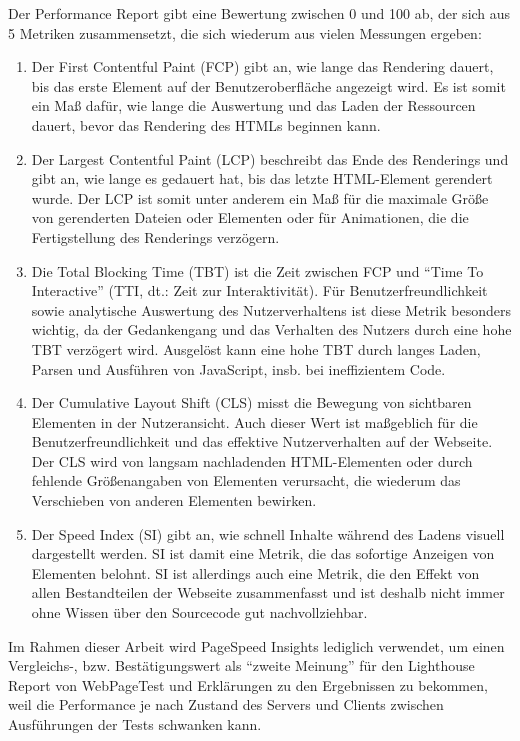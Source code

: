 \documentclass[11pt,a4paper]{article}
\begin{document}
Der Performance Report gibt eine Bewertung zwischen 0 und 100 ab, der sich aus 5 Metriken zusammensetzt, die sich wiederum aus vielen Messungen ergeben:

\begin{enumerate}
  \item Der First Contentful Paint (FCP) gibt an, wie lange das Rendering dauert, bis das erste Element auf der Benutzeroberfläche angezeigt wird.
  Es ist somit ein Maß dafür, wie lange die Auswertung und das Laden der Ressourcen dauert, bevor das Rendering des HTMLs beginnen kann.
  \item Der Largest Contentful Paint (LCP) beschreibt das Ende des Renderings und gibt an, wie lange es gedauert hat, bis das letzte HTML-Element gerendert wurde.
  Der LCP ist somit unter anderem ein Maß für die maximale Größe von gerenderten Dateien oder Elementen oder für Animationen, die die Fertigstellung des Renderings verzögern.
  \item Die Total Blocking Time (TBT) ist die Zeit zwischen FCP und \enquote{Time To Interactive} (TTI, dt.: Zeit zur Interaktivität).
  Für Benutzerfreundlichkeit sowie analytische Auswertung des Nutzerverhaltens ist diese Metrik besonders wichtig, da der Gedankengang und das Verhalten des Nutzers durch eine hohe TBT verzögert wird.
  Ausgelöst kann eine hohe TBT durch langes Laden, Parsen und Ausführen von JavaScript, insb. bei ineffizientem Code.
  \item Der Cumulative Layout Shift (CLS) misst die Bewegung von sichtbaren Elementen in der Nutzeransicht. Auch dieser Wert ist maßgeblich für die Benutzerfreundlichkeit und das effektive Nutzerverhalten auf der Webseite.
  Der CLS wird von langsam nachladenden HTML-Elementen oder durch fehlende Größenangaben von Elementen verursacht, die wiederum das Verschieben von anderen Elementen bewirken.
  \item Der Speed Index (SI) gibt an, wie schnell Inhalte während des Ladens visuell dargestellt werden. SI ist damit eine Metrik, die das sofortige Anzeigen von Elementen belohnt.
  SI ist allerdings auch eine Metrik, die den Effekt von allen Bestandteilen der Webseite zusammenfasst und ist deshalb nicht immer ohne Wissen über den Sourcecode gut nachvollziehbar. 
\end{enumerate}

Im Rahmen dieser Arbeit wird PageSpeed Insights lediglich verwendet, um einen Vergleichs-, bzw. Bestätigungswert als \enquote{zweite Meinung} für den Lighthouse Report von WebPageTest und Erklärungen zu den Ergebnissen zu bekommen, weil die Performance je nach Zustand des Servers und Clients zwischen Ausführungen der Tests schwanken kann.
\end{document}
